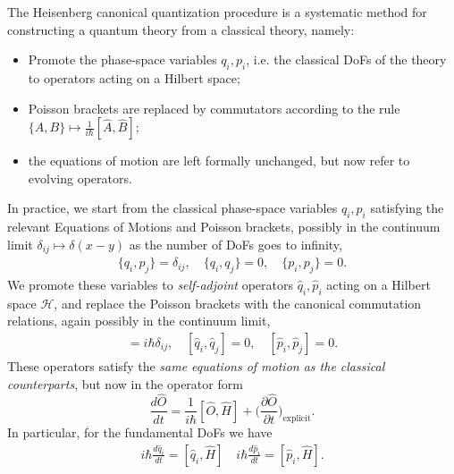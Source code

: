\documentclass[../QFT_main.tex]{subfiles}
\begin{document}
\begin{mytheorem}
%
The Heisenberg canonical quantization procedure is a systematic method for constructing a quantum theory from a classical theory, namely:
\begin{itemize}
    \item Promote the phase-space variables \(q_i, p_i\), i.e. the classical DoFs of the theory to operators acting on a Hilbert space;
    \item Poisson brackets are replaced by commutators according to the rule {\small$\displaystyle \{A, B\} \mapsto \frac{1}{i\hbar} [\hat{A}, \hat{B}];$}
    \item the equations of motion are left formally unchanged, but now refer to evolving operators.
\end{itemize}
In practice, we start from the classical phase-space variables \(q_i, p_i\) satisfying the relevant Equations of Motions and  Poisson brackets, possibly in the continuum limit {\small$\delta_{ij} \mapsto \delta(x-y)$} as the number of DoFs goes to infinity,
{\small\begin{align}
\{q_i, p_j\} = \delta_{ij}, \quad \{q_i, q_j\} = 0, \quad \{p_i, p_j\} = 0.
\end{align}}
We promote these variables to \emph{self-adjoint} operators \(\hat{q}_i, \hat{p}_i\) acting on a Hilbert space \(\mathcal{H}\), and replace the Poisson brackets with the canonical commutation relations, again possibly in the continuum limit,
{\small\begin{align}
[\hat{q}_i, \hat{p}_j] = i\hbar \delta_{ij}, \quad [\hat{q}_i, \hat{q}_j] = 0, \quad [\hat{p}_i, \hat{p}_j] = 0.
\end{align}}
These operators satisfy the \emph{same equations of motion as the classical counterparts}, but now in the operator form
{\small\begin{equation}
    \frac{d\hat{O}}{dt} = \frac{1}{i\hbar} [\hat{O},\hat{H}] + \Big(\frac{\partial \hat{O}}{\partial t}\Big)_{\text{explicit}}.
\end{equation}}
In particular, for the fundamental DoFs we have
{\small\begin{align}
    i\hbar\frac{d\hat{q}_i}{dt} = [\hat{q}_i, \hat{H}] \quad i\hbar\frac{d\hat{p}_i}{dt} = [\hat{p}_i, \hat{H}].
\end{align}}
\end{mytheorem}
\end{document}

